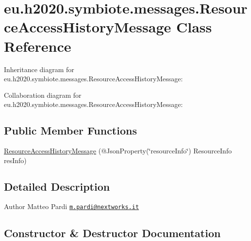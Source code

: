 \hypertarget{classeu_1_1h2020_1_1symbiote_1_1messages_1_1ResourceAccessHistoryMessage}{}\section{eu.\+h2020.\+symbiote.\+messages.\+Resource\+Access\+History\+Message Class Reference}
\label{classeu_1_1h2020_1_1symbiote_1_1messages_1_1ResourceAccessHistoryMessage}


Inheritance diagram for eu.\+h2020.\+symbiote.\+messages.\+Resource\+Access\+History\+Message\+:


Collaboration diagram for eu.\+h2020.\+symbiote.\+messages.\+Resource\+Access\+History\+Message\+:
\subsection*{Public Member Functions}
\begin{DoxyCompactItemize}
\item 
\hyperlink{classeu_1_1h2020_1_1symbiote_1_1messages_1_1ResourceAccessHistoryMessage_ac5e9f1405d8028502ce403c99c1f6941}{Resource\+Access\+History\+Message} (@Json\+Property(\char`\"{}resource\+Info\char`\"{}) Resource\+Info res\+Info)
\end{DoxyCompactItemize}


\subsection{Detailed Description}
\begin{DoxyAuthor}{Author}
Matteo Pardi \href{mailto:m.pardi@nextworks.it}{\tt m.\+pardi@nextworks.\+it} 
\end{DoxyAuthor}


\subsection{Constructor \& Destructor Documentation}
\mbox{\label{classeu_1_1h2020_1_1symbiote_1_1messages_1_1ResourceAccessHistoryMessage_ac5e9f1405d8028502ce403c99c1f6941}} 

